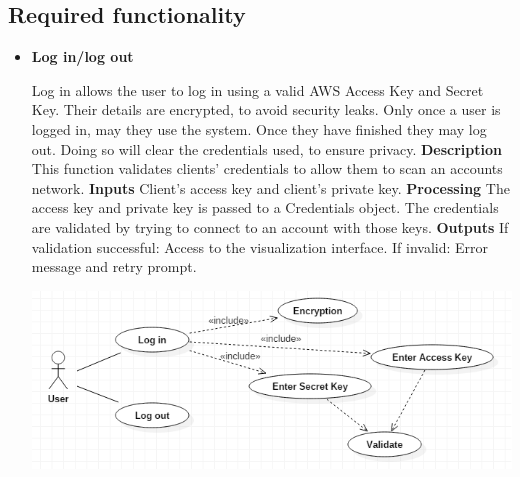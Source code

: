\documentclass[a4paper,12pt]{report}
\begin{document}
\subsection{Required functionality}
\begin{itemize}
	\item \textbf{Log in/log out}
		\begin{flushleft}
		Log in allows the user to log in using a valid AWS Access Key and Secret Key. Their details are encrypted, to avoid security leaks. Only once a user is logged in, may they use the system. Once they have finished they may log out. Doing so will clear the credentials used, to ensure privacy.
	\newline
\textbf{Description}
	\newline
	This function validates clients' credentials to allow them to scan an accounts network.
	\newline
	\textbf{Inputs}
	\newline
	Client’s access key and client’s private key.
	\newline
	\textbf{Processing}
	\newline
	The access key and private key is passed to a Credentials object. The credentials are validated by
	trying to connect to an account with those keys.
	\newline
	\textbf{Outputs}
	\newline
	If validation successful:
	\newline
	Access to the visualization interface.
	\newline
	If invalid:
	\newline
	Error message and retry prompt.
	\newline
		\end{flushleft}
		\begin{center}
  	 	\includegraphics[width=1\textwidth] {./Diagrams/LoginUseCase.png}\\[0.4cm]    
		\end{center}
	\newpage


\end{itemize}
\end{document}
